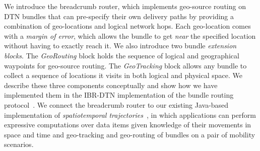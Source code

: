 We introduce the {\sc breadcrumb} router, which implements geo-source routing on DTN bundles that can pre-specify their own delivery paths by providing a combination of geo-locations and logical network hops. 
Each geo-location comes with a {\em margin of error}, which allows the bundle to get {\em near} the specified location without having to exactly reach it. We also introduce two bundle {\em extension blocks}. The {\em GeoRouting} block holds the sequence of logical and geographical waypoints for geo-source routing. The {\em GeoTracking} block allows any bundle to collect a sequence of locations it visits in both logical and physical space. We describe these three components conceptually and show how we have implemented them in the IBR-DTN implementation of the bundle routing protocol~\cite{IBR-DTN-WASA}. We connect the {\sc breadcrumb} router to our existing Java-based implementation of {\em spatiotemporal trajectories}~\cite{michel12:spatiotemporal}, in which applications can perform expressive computations over data items given knowledge of their movements in space and time and geo-tracking and geo-routing of bundles on a pair of mobility scenarios.






